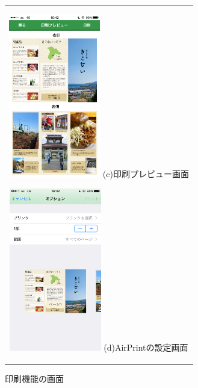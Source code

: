 \begin{figure}[htbp]
\begin{center}
\begin{tabular}{c}
      \begin{minipage}{0.33\hsize}
        \begin{center}
\includegraphics[width=4cm, bb=0 0 304 570]{kiko_print4.PNG}
          \hspace{1cm} (c)印刷プレビュー画面
        \end{center}
      \end{minipage}

      \begin{minipage}{0.33\hsize}
        \begin{center}
\includegraphics[width=4cm, bb=0 0 304 570]{kiko_print5.PNG}
          \hspace{1cm} (d)AirPrintの設定画面
        \end{center}
      \end{minipage}
      

    \end{tabular}
    \caption{印刷機能の画面}
    \label{fig:lena}
  \end{center}
\end{figure}　　　　　　　

